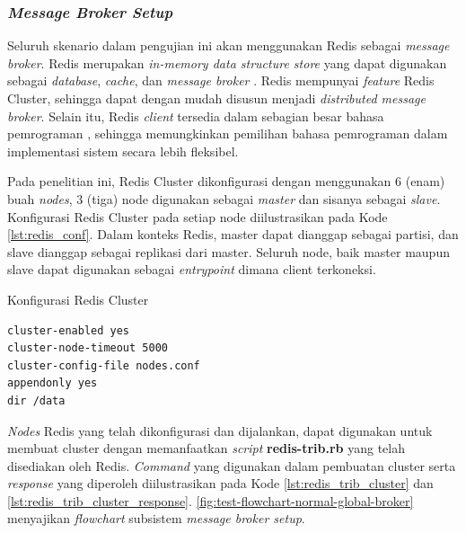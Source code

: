 \subsubsection{\textit{Message Broker Setup}}
\label{ssec:broker-setup}
Seluruh skenario dalam pengujian ini akan menggunakan Redis sebagai \textit{message broker}. Redis merupakan \textit{in-memory data structure store} yang dapat digunakan sebagai \textit{database}, \textit{cache}, dan \textit{message broker} \citep{redis_introduction_2017}. Redis mempunyai \textit{feature} Redis Cluster, sehingga dapat dengan mudah disusun menjadi \textit{distributed message broker}. Selain itu, Redis \textit{client} tersedia dalam sebagian besar bahasa pemrograman \citep{redis_clients_2017}, sehingga memungkinkan pemilihan bahasa pemrograman dalam implementasi sistem secara lebih fleksibel.


Pada penelitian ini, Redis Cluster dikonfigurasi dengan menggunakan 6 (enam) buah \textit{nodes}, 3 (tiga) node digunakan sebagai \textit{master} dan sisanya sebagai \textit{slave}. Konfigurasi Redis Cluster pada setiap node diilustrasikan pada Kode \autoref{lst:redis_conf}. Dalam konteks Redis, master dapat dianggap sebagai partisi, dan slave dianggap sebagai replikasi dari master. Seluruh node, baik master maupun slave dapat digunakan sebagai \textit{entrypoint} dimana client terkoneksi.


\begin{listing}[!]
	\captionsetup{format=hang}
	\caption{Konfigurasi Redis Cluster}
	\label{lst:redis_conf}
	\begin{verbatim}
cluster-enabled yes
cluster-node-timeout 5000
cluster-config-file nodes.conf
appendonly yes
dir /data
	\end{verbatim}
\end{listing}


\textit{Nodes} Redis yang telah dikonfigurasi dan dijalankan, dapat digunakan untuk membuat cluster dengan memanfaatkan  \textit{script} \textbf{redis-trib.rb} yang telah disediakan oleh Redis. \textit{Command} yang digunakan dalam pembuatan cluster serta  \textit{response} yang diperoleh diilustrasikan pada Kode \autoref{lst:redis_trib_cluster} dan \autoref{lst:redis_trib_cluster_response}. \autoref{fig:test-flowchart-normal-global-broker} 
menyajikan \textit{flowchart} subsistem \textit{message broker setup}. 


